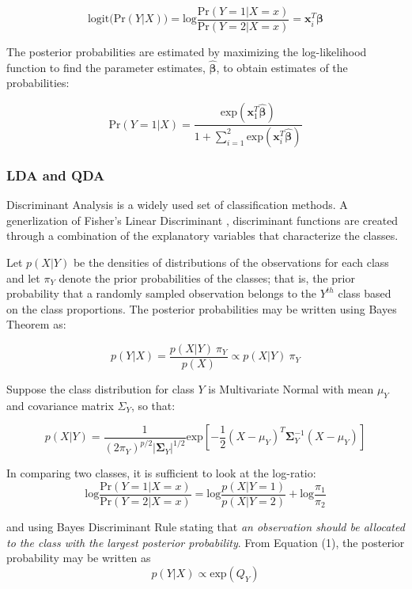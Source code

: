 \documentclass[12pt,]{article}
\begin{document}
\[
\text{logit} \Big( \text{Pr}(Y \vert X) \Big) = \text{log} \frac{ \text{Pr}(Y=1 \vert X=x) }{ \text{Pr}(Y=2 \vert X=x) }  = \mathbf{x}^T_i\boldsymbol{\beta}  
\]

The posterior probabilities are estimated by maximizing the
log-likelihood function to find the parameter estimates,
\(\hat{\boldsymbol{\beta}}\), to obtain estimates of the probabilities:

\[
\text{Pr}(Y=1 \vert X) = \frac{ \text{exp}(\mathbf{x}^T_1 \hat{\boldsymbol{\beta}}) }{ 1 + \sum^2_{i=1} \text{exp}(\mathbf{x}^T_i \hat{\boldsymbol{\beta}}) }
\]

\subsubsection{LDA and QDA}\label{lda-and-qda}

Discriminant Analysis is a widely used set of classification methods. A
generlization of Fisher's Linear Discriminant \citep{fisher_use_1936},
discriminant functions are created through a combination of the
explanatory variables that characterize the classes.

Let \(p(X \vert Y)\) be the densities of distributions of the
observations for each class and let \(\pi_Y\) denote the prior
probabilities of the classes; that is, the prior probability that a
randomly sampled observation belongs to the \(Y^{th}\) class based on
the class proportions. The posterior probabilities may be written using
Bayes Theorem as:

\[
p(Y \vert X) = \frac{p(X \vert Y) ~\pi_Y}{p(X)} \propto p(X \vert Y) ~\pi_Y   \tag{1}
\]

Suppose the class distribution for class \(Y\) is Multivariate Normal
with mean \(\mu_Y\) and covariance matrix \(\Sigma_Y\), so that:

\[
p(X \vert Y) = \frac{1}{(2 \pi_Y)^{p/2} \vert\boldsymbol{\Sigma}_Y\vert ^{1/2}} \text{exp} \left[-\frac{1}{2}(X - \mu_Y)^T \boldsymbol{\Sigma}^{-1}_Y(X - \mu_Y)  \right]  \tag{2}
\]

In comparing two classes, it is sufficient to look at the log-ratio: \[
\text{log} \frac{\text{Pr}(Y=1 \vert X=x)}{\text{Pr}(Y=2 \vert X=x)} = \text{log}\frac{p(X \vert Y=1)}{p(X \vert Y=2)} + \text{log}\frac{\pi_1}{\pi_2}   \tag{3}
\]

and using Bayes Discriminant Rule stating that \emph{an observation
should be allocated to the class with the largest posterior
probability}. From Equation (1), the posterior probability may be
written as \[
p(Y \vert X) \propto \text{exp} \left( Q_Y \right)    \tag{4}
\]
\end{document}
